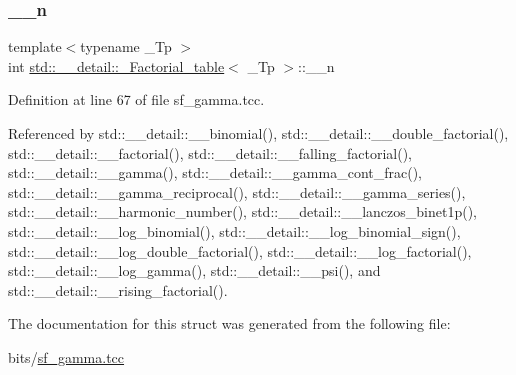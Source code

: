 \subsubsection{\texorpdfstring{\+\_\+\+\_\+n}{\_\_n}}
{\footnotesize\ttfamily template$<$typename \+\_\+\+Tp $>$ \\
int \hyperlink{structstd_1_1____detail_1_1__Factorial__table}{std\+::\+\_\+\+\_\+detail\+::\+\_\+\+Factorial\+\_\+table}$<$ \+\_\+\+Tp $>$\+::\+\_\+\+\_\+n}



Definition at line 67 of file sf\+\_\+gamma.\+tcc.



Referenced by std\+::\+\_\+\+\_\+detail\+::\+\_\+\+\_\+binomial(), std\+::\+\_\+\+\_\+detail\+::\+\_\+\+\_\+double\+\_\+factorial(), std\+::\+\_\+\+\_\+detail\+::\+\_\+\+\_\+factorial(), std\+::\+\_\+\+\_\+detail\+::\+\_\+\+\_\+falling\+\_\+factorial(), std\+::\+\_\+\+\_\+detail\+::\+\_\+\+\_\+gamma(), std\+::\+\_\+\+\_\+detail\+::\+\_\+\+\_\+gamma\+\_\+cont\+\_\+frac(), std\+::\+\_\+\+\_\+detail\+::\+\_\+\+\_\+gamma\+\_\+reciprocal(), std\+::\+\_\+\+\_\+detail\+::\+\_\+\+\_\+gamma\+\_\+series(), std\+::\+\_\+\+\_\+detail\+::\+\_\+\+\_\+harmonic\+\_\+number(), std\+::\+\_\+\+\_\+detail\+::\+\_\+\+\_\+lanczos\+\_\+binet1p(), std\+::\+\_\+\+\_\+detail\+::\+\_\+\+\_\+log\+\_\+binomial(), std\+::\+\_\+\+\_\+detail\+::\+\_\+\+\_\+log\+\_\+binomial\+\_\+sign(), std\+::\+\_\+\+\_\+detail\+::\+\_\+\+\_\+log\+\_\+double\+\_\+factorial(), std\+::\+\_\+\+\_\+detail\+::\+\_\+\+\_\+log\+\_\+factorial(), std\+::\+\_\+\+\_\+detail\+::\+\_\+\+\_\+log\+\_\+gamma(), std\+::\+\_\+\+\_\+detail\+::\+\_\+\+\_\+psi(), and std\+::\+\_\+\+\_\+detail\+::\+\_\+\+\_\+rising\+\_\+factorial().



The documentation for this struct was generated from the following file\+:\begin{DoxyCompactItemize}
\item 
bits/\hyperlink{sf__gamma_8tcc}{sf\+\_\+gamma.\+tcc}\end{DoxyCompactItemize}
